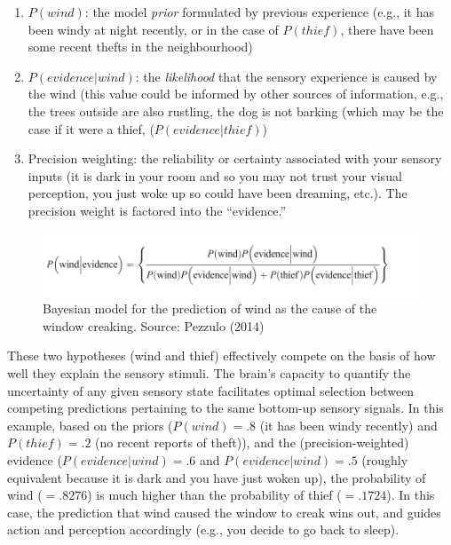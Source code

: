 \begin{CJK}{UTF8}{gbsn}
\begin{enumerate}
\item $P(wind)$: the model \textit{prior} formulated by previous experience (e.g., it has been windy at night recently, or in the case of $P(thief)$, there have been some recent thefts in the neighbourhood)
\item $P(evidence|wind)$: the \textit{likelihood} that the sensory experience is caused by the wind (this value could be informed by other sources of information, e.g., the trees outside are also rustling, the dog is not barking (which may be the case if it were a thief, ($P(evidence|thief)$)
\item Precision weighting: the reliability or certainty associated with your sensory inputs (it is dark in your room and so you may not trust your visual perception, you just woke up so could have been dreaming, etc.).  The precision weight is factored into the ``evidence.''
\end{enumerate}

      \begin{figure}[htbp]
      \begin{center}
      \includegraphics[scale=.5]{images/windThief.png}
        \caption{Bayesian model for the prediction of wind as the cause of the window creaking. Source: Pezzulo (2014)}
          \label{fig:windThief}
      \end{center}
      \end{figure}

These two hypotheses (wind and thief) effectively compete on the basis of how well they explain the sensory stimuli.  The brain's capacity to quantify the uncertainty of any given sensory state facilitates optimal selection between competing predictions pertaining to the same bottom-up sensory signals.  In this example, based on the priors ($P(wind) = .8$ (it has been windy recently) and $P(thief) = .2$ (no recent reports of theft)), and the (precision-weighted) evidence ($P(evidence|wind) = .6$ and $P(evidence|wind) = .5$ (roughly equivalent because it is dark and you have just woken up), the probability of wind ($= .8276$) is much higher than the probability of thief ($= .1724$).  In this case, the prediction that wind caused the window to creak wins out, and guides action and perception accordingly (e.g., you decide to go back to sleep).


\end{CJK}
